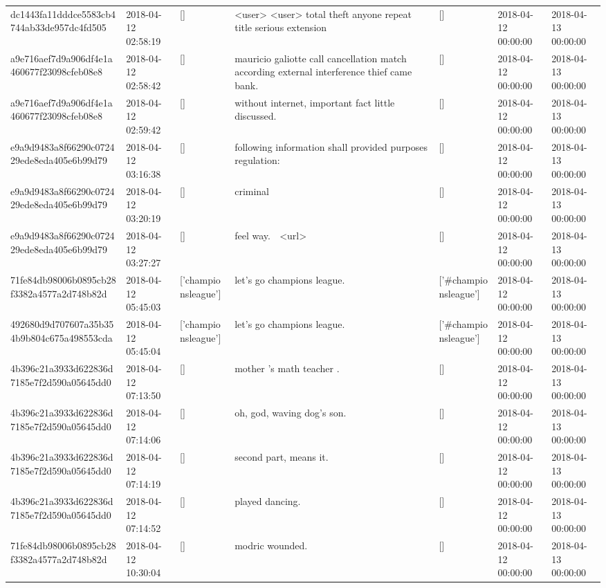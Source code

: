 \begin{tabular}{lllllll}
dc1443fa11dddce5583cb4744ab33de957dc4fd505 & 2018-04-12 02:58:19 & [] & <user> <user> total theft anyone repeat title serious extension & [] & 2018-04-12 00:00:00 & 2018-04-13 00:00:00 \\
a9e716aef7d9a906df4e1a460677f23098cfeb08e8 & 2018-04-12 02:58:42 & [] & mauricio galiotte call cancellation match according external interference thief came bank. & [] & 2018-04-12 00:00:00 & 2018-04-13 00:00:00 \\
a9e716aef7d9a906df4e1a460677f23098cfeb08e8 & 2018-04-12 02:59:42 & [] & without internet, important fact little discussed. & [] & 2018-04-12 00:00:00 & 2018-04-13 00:00:00 \\
e9a9d9483a8f66290c072429ede8eda405e6b99d79 & 2018-04-12 03:16:38 & [] & following information shall provided purposes regulation: & [] & 2018-04-12 00:00:00 & 2018-04-13 00:00:00 \\
e9a9d9483a8f66290c072429ede8eda405e6b99d79 & 2018-04-12 03:20:19 & [] & criminal & [] & 2018-04-12 00:00:00 & 2018-04-13 00:00:00 \\
e9a9d9483a8f66290c072429ede8eda405e6b99d79 & 2018-04-12 03:27:27 & [] & feel way. 🤔 <url> & [] & 2018-04-12 00:00:00 & 2018-04-13 00:00:00 \\
71fe84db98006b0895cb28f3382a4577a2d748b82d & 2018-04-12 05:45:03 & ['championsleague'] & let's go champions league. & ['#championsleague'] & 2018-04-12 00:00:00 & 2018-04-13 00:00:00 \\
492680d9d707607a35b354b9b804c675a498553cda & 2018-04-12 05:45:04 & ['championsleague'] & let's go champions league. & ['#championsleague'] & 2018-04-12 00:00:00 & 2018-04-13 00:00:00 \\
4b396c21a3933d622836d7185e7f2d590a05645dd0 & 2018-04-12 07:13:50 & [] & mother 's math teacher . & [] & 2018-04-12 00:00:00 & 2018-04-13 00:00:00 \\
4b396c21a3933d622836d7185e7f2d590a05645dd0 & 2018-04-12 07:14:06 & [] & oh, god, waving dog's son. & [] & 2018-04-12 00:00:00 & 2018-04-13 00:00:00 \\
4b396c21a3933d622836d7185e7f2d590a05645dd0 & 2018-04-12 07:14:19 & [] & second part, means it. & [] & 2018-04-12 00:00:00 & 2018-04-13 00:00:00 \\
4b396c21a3933d622836d7185e7f2d590a05645dd0 & 2018-04-12 07:14:52 & [] & played dancing. & [] & 2018-04-12 00:00:00 & 2018-04-13 00:00:00 \\
71fe84db98006b0895cb28f3382a4577a2d748b82d & 2018-04-12 10:30:04 & [] & modric wounded. & [] & 2018-04-12 00:00:00 & 2018-04-13 00:00:00 \\

\end{tabular}
